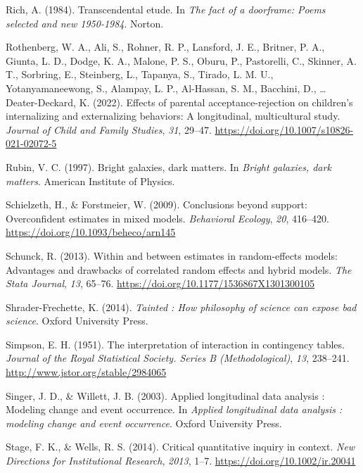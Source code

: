 \documentclass[
  letterpaper,
  DIV=11,
  numbers=noendperiod]{scrreprt}
\newlength{\cslhangindent}
\newenvironment{CSLReferences}[2] %
 {\begin{list}{}{%
  \setlength{\itemindent}{0pt}
  \setlength{\leftmargin}{0pt}
  \setlength{\parsep}{0pt}
  \ifodd #1
   \setlength{\leftmargin}{\cslhangindent}
   \setlength{\itemindent}{-1\cslhangindent}
  \fi
  \setlength{\itemsep}{#2\baselineskip}}}
 {\end{list}}
\begin{document}
\begin{CSLReferences}{1}{0}
Rich, A. (1984). Transcendental etude. In \emph{The fact of a doorframe:
Poems selected and new 1950-1984}. Norton.

Rothenberg, W. A., Ali, S., Rohner, R. P., Lansford, J. E., Britner, P.
A., Giunta, L. D., Dodge, K. A., Malone, P. S., Oburu, P., Pastorelli,
C., Skinner, A. T., Sorbring, E., Steinberg, L., Tapanya, S., Tirado, L.
M. U., Yotanyamaneewong, S., Alampay, L. P., Al-Hassan, S. M., Bacchini,
D., \ldots{} Deater-Deckard, K. (2022). Effects of parental
acceptance-rejection on children's internalizing and externalizing
behaviors: A longitudinal, multicultural study. \emph{Journal of Child
and Family Studies}, \emph{31}, 29--47.
\url{https://doi.org/10.1007/s10826-021-02072-5}

Rubin, V. C. (1997). Bright galaxies, dark matters. In \emph{Bright
galaxies, dark matters}. American Institute of Physics.

Schielzeth, H., \& Forstmeier, W. (2009). Conclusions beyond support:
Overconfident estimates in mixed models. \emph{Behavioral Ecology},
\emph{20}, 416--420. \url{https://doi.org/10.1093/beheco/arn145}

Schunck, R. (2013). Within and between estimates in random-effects
models: Advantages and drawbacks of correlated random effects and hybrid
models. \emph{The Stata Journal}, \emph{13}, 65--76.
\url{https://doi.org/10.1177/1536867X1301300105}

Shrader-Frechette, K. (2014). \emph{Tainted : How philosophy of science
can expose bad science}. Oxford University Press.

Simpson, E. H. (1951). The interpretation of interaction in contingency
tables. \emph{Journal of the Royal Statistical Society. Series B
(Methodological)}, \emph{13}, 238--241.
\url{http://www.jstor.org/stable/2984065}

Singer, J. D., \& Willett, J. B. (2003). Applied longitudinal data
analysis : Modeling change and event occurrence. In \emph{Applied
longitudinal data analysis : modeling change and event occurrence}.
Oxford University Press.

Stage, F. K., \& Wells, R. S. (2014). Critical quantitative inquiry in
context. \emph{New Directions for Institutional Research}, \emph{2013},
1--7. \url{https://doi.org/10.1002/ir.20041}


\end{CSLReferences}
\end{document}
